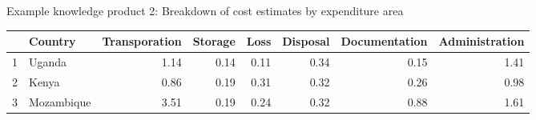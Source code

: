 \documentclass{article}
\begin{document}
\begin{center}
Example knowledge product 2: Breakdown of cost estimates by expenditure area
\end{center}
\begin{table}[ht]
\centering
\begin{tabular}{rlrrrrrr}
  \hline
 & Country & Transporation & Storage & Loss & Disposal & Documentation & Administration \\ 
  \hline
1 & Uganda & 1.14 & 0.14 & 0.11 & 0.34 & 0.15 & 1.41 \\ 
  2 & Kenya & 0.86 & 0.19 & 0.31 & 0.32 & 0.26 & 0.98 \\ 
  3 & Mozambique & 3.51 & 0.19 & 0.24 & 0.32 & 0.88 & 1.61 \\ 
   \hline
\end{tabular}
\end{table}


\vfill

%   
\end{document}
